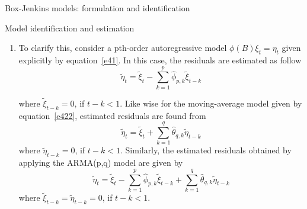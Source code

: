\documentclass[8pt]{beamer}
\renewcommand{\emph}[1]{\textcolor{myorange}{#1}}
\begin{document}
 \begin{frame}{Box-Jenkins models: formulation and identification}
    \begin{block}{Model identification and estimation}
    \end{block}
    \begin{enumerate}
        \item To clarify this, consider a \emph{pth-order autoregressive model} $\phi(B) \xi_t = \eta_t$ given explicitly by equation~\ref{e41}. In this case, the \emph{residuals} are estimated as follow
            \begin{equation}
                \tilde{\eta}_t = \tilde{\xi}_t - \sum_{k=1}^p \hat{\phi}_{p,k} \tilde{\xi}_{t-k}
                \label{e442}
            \end{equation}
  
            where $\tilde{\xi}_{t-k} = 0$, if $t-k <1$. Like wise for the \emph{moving-average model} given by equation~\ref{e422}, estimated \emph{residuals} are found from 
            \begin{equation}
                \tilde{\eta}_t = \tilde{\xi}_t + \sum_{k=1}^q \hat{\theta}_{q,k} \tilde{\eta}_{t-k}
                \label{e443}
            \end{equation}
            where $\tilde{\eta}_{t-k} = 0$, if $t-k < 1$. Similarly, the estimated \emph{residuals} obtained by applying the \emph{ARMA(p,q)} model are given by
\begin{equation}
                \tilde{\eta}_t = \tilde{\xi}_t - \sum_{k=1}^p \hat{\phi}_{p,k} \tilde{\xi}_{t-k} + \sum_{k=1}^q \hat{\theta}_{q,k} \tilde{\eta}_{t-k}
                \label{e444}
            \end{equation}
            where $\tilde{\xi}_{t-k} =\tilde{\eta}_{t-k} = 0$, if $t-k < 1$.
    \end{enumerate}
\end{frame}
\end{document}
